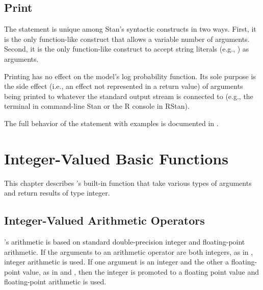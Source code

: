 \section{Print}

The  statement is unique among Stan's syntactic constructs
in two ways.  First, it is the only function-like construct that
allows a variable number of arguments.  Second, it is the only
function-like construct to accept string literals (e.g., ) as arguments.

Printing has no effect on the model's log probability function.  Its
sole purpose is the side effect (i.e., an effect not represented in a
return value) of arguments being printed to whatever the standard
output stream is connected to (e.g., the terminal in command-line Stan
or the R console in RStan).
%
\begin{description}
\end{description}
%
The full behavior of the  statement with examples is
documented in .


\chapter{Integer-Valued Basic Functions}

\noindent
This chapter describes \Stan's built-in function that take various
types of arguments and return results of type integer.


\section{Integer-Valued Arithmetic Operators}\label{int-arithmetic.section}

\Stan's arithmetic is based on standard double-precision \Cpp integer and
floating-point arithmetic.  If the arguments to an arithmetic operator
are both integers, as in , integer arithmetic is used.  If
one argument is an integer and the other a floating-point value, as in
 and , then the integer is promoted to a floating
point value and floating-point arithmetic is used.

